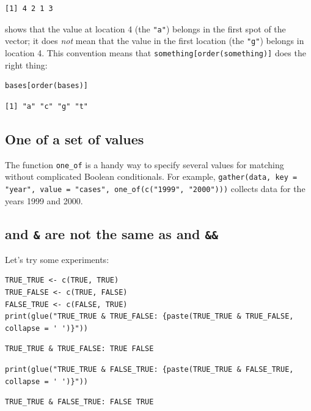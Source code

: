 \begin{lstlisting}
[1] 4 2 1 3
\end{lstlisting}

\noindent
shows that the value at location 4 (the \texttt{"a"}) belongs in the first spot of the vector;
it does \emph{not} mean that the value in the first location (the \texttt{"g"}) belongs in location 4.
This convention means that \texttt{something[order(something)]} does the right thing:

\begin{lstlisting}
bases[order(bases)]
\end{lstlisting}

\begin{lstlisting}
[1] "a" "c" "g" "t"
\end{lstlisting}

\subsection*{One of a set of values}

The function \texttt{one\_of} is a handy way to specify several values for matching
without complicated Boolean conditionals.
For example,
\texttt{gather(data, key = "year", value = "cases", one\_of(c("1999", "2000")))}
collects data for the years 1999 and 2000.

\subsection*{\texttt{{\textbar}} and \texttt{\&} are not the same as \texttt{{\textbar}{\textbar}} and \texttt{\&\&}}

Let's try some experiments:

\begin{lstlisting}
TRUE_TRUE <- c(TRUE, TRUE)
TRUE_FALSE <- c(TRUE, FALSE)
FALSE_TRUE <- c(FALSE, TRUE)
print(glue("TRUE_TRUE & TRUE_FALSE: {paste(TRUE_TRUE & TRUE_FALSE, collapse = ' ')}"))
\end{lstlisting}

\begin{lstlisting}
TRUE_TRUE & TRUE_FALSE: TRUE FALSE
\end{lstlisting}

\begin{lstlisting}
print(glue("TRUE_TRUE & FALSE_TRUE: {paste(TRUE_TRUE & FALSE_TRUE, collapse = ' ')}"))
\end{lstlisting}

\begin{lstlisting}
TRUE_TRUE & FALSE_TRUE: FALSE TRUE
\end{lstlisting}

